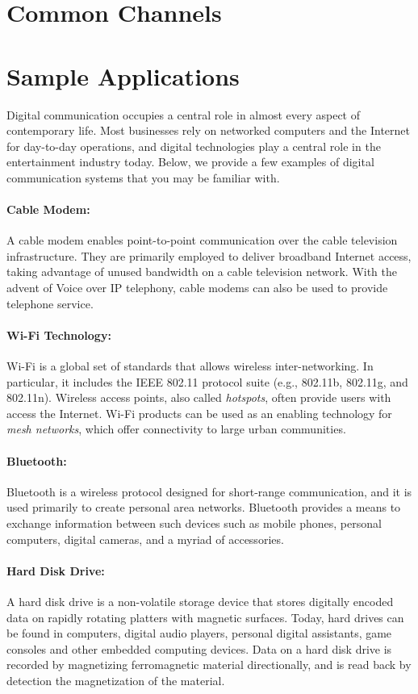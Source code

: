 \section{Common Channels}


\section{Sample Applications}

Digital communication occupies a central role in almost every aspect of contemporary life.
Most businesses rely on networked computers and the Internet for day-to-day operations, and digital technologies play a central role in the entertainment industry today.
Below, we provide a few examples of digital communication systems that you may be familiar with.

\paragraph{Cable Modem:}
A cable modem enables point-to-point communication over the cable television infrastructure.
They are primarily employed to deliver broadband Internet access, taking advantage of unused bandwidth on a cable television network.
With the advent of Voice over IP telephony, cable modems can also be used to provide telephone service.

\paragraph{Wi-Fi Technology:}
Wi-Fi is a global set of standards that allows wireless inter-networking.
In particular, it includes the IEEE 802.11 protocol suite (e.g., 802.11b, 802.11g, and 802.11n).
Wireless access points, also called \emph{hotspots}, often provide users with access the Internet.
Wi-Fi products can be used as an enabling technology for \emph{mesh networks}, which offer connectivity to large urban communities.

\paragraph{Bluetooth:}
Bluetooth is a wireless protocol designed for short-range communication, and it is used primarily to create personal area networks.
Bluetooth provides a means to exchange information between such devices such as mobile phones, personal computers, digital cameras, and a myriad of accessories.

\paragraph{Hard Disk Drive:}
A hard disk drive is a non-volatile storage device that stores digitally encoded data on rapidly rotating platters with magnetic surfaces.
Today, hard drives can be found in computers, digital audio players, personal digital assistants, game consoles and other embedded computing devices.
Data on a hard disk drive is recorded by magnetizing ferromagnetic material directionally, and is read back by detection the magnetization of the material.

